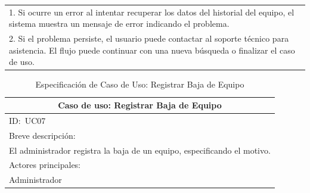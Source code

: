 \documentclass[stu, 12pt, letterpaper, donotrepeattitle, floatsintext, natbib]{apa7}
\begin{document}
\begin{longtable}{@{} p{16.5cm} @{}}
    \hspace{1cm}1. Si ocurre un error al intentar recuperar los datos del historial del equipo, el sistema muestra un mensaje de error indicando el problema.                           \\
    \hspace{1cm}2. Si el problema persiste, el usuario puede contactar al soporte técnico para asistencia. El flujo puede continuar con una nueva búsqueda o finalizar el caso de uso.  \\ \bottomrule
\end{longtable}
\newpage
\begin{longtable}{@{} p{16.5cm} @{}}
    \caption{Especificación de Caso de Uso: Registrar Baja de Equipo}\label{tab:UC07}                                                                                                                                                 \\ \toprule
    \multicolumn{1}{c}{Caso de uso: Registrar Baja de Equipo}                                                                                                                                                                         \\ \midrule
    ID:~UC07                                                                                                                                                                                                                          \\ \midrule
    Breve descripción:                                                                                                                                                                                                                \\
    El administrador registra la baja de un equipo, especificando el motivo.                                                                                                                                                          \\ \midrule
    Actores principales:                                                                                                                                                                                                              \\
    Administrador                                                                                                                                                                                                                     \\ \midrule

\end{longtable}
\end{document}
